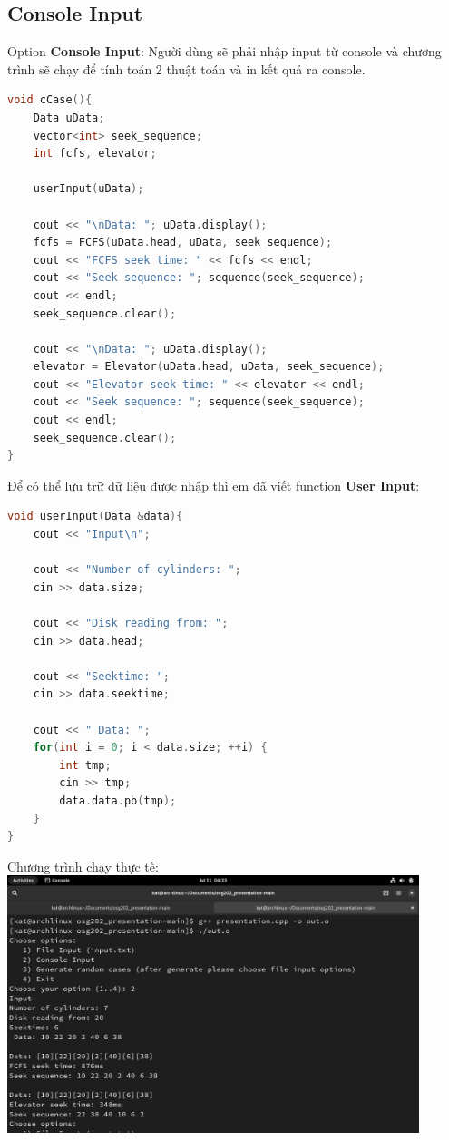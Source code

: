 \documentclass{report}
\begin{document}
        \subsection{Console Input}
            
            Option \textbf{Console Input}:
            Người dùng sẽ phải nhập input từ console và chương trình sẽ chạy để tính toán 2 thuật toán và in kết quả ra console.

            \begin{lstlisting}[language=C++, caption=Console Input Function]
void cCase(){
    Data uData;
    vector<int> seek_sequence;
    int fcfs, elevator;

    userInput(uData);
    
    cout << "\nData: "; uData.display();
    fcfs = FCFS(uData.head, uData, seek_sequence);
    cout << "FCFS seek time: " << fcfs << endl;
    cout << "Seek sequence: "; sequence(seek_sequence);
    cout << endl;
    seek_sequence.clear();

    cout << "\nData: "; uData.display();
    elevator = Elevator(uData.head, uData, seek_sequence);
    cout << "Elevator seek time: " << elevator << endl;
    cout << "Seek sequence: "; sequence(seek_sequence); 
    cout << endl;
    seek_sequence.clear();
}
            \end{lstlisting}

            Để có thể lưu trữ dữ liệu được nhập thì em đã viết function \textbf{User Input}:

            \begin{lstlisting}[language=C++, caption = "User Input from Console"]
void userInput(Data &data){
    cout << "Input\n";

    cout << "Number of cylinders: ";
    cin >> data.size;

    cout << "Disk reading from: ";
    cin >> data.head;

    cout << "Seektime: ";
    cin >> data.seektime;

    cout << " Data: ";
    for(int i = 0; i < data.size; ++i) {
        int tmp;
        cin >> tmp;
        data.data.pb(tmp);
    }
}
            \end{lstlisting}

    Chương trình chạy thực tế: \\
    \includegraphics[width = 12cm]{images/consoleinput.png}
            
\end{document}
